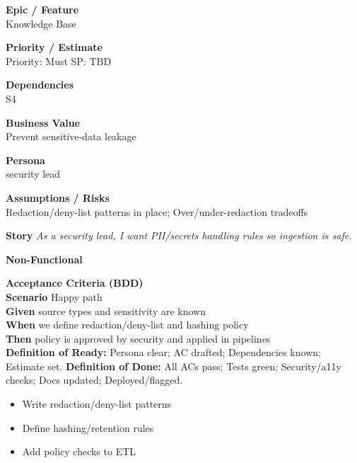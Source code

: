 \documentclass[11pt,a4paper]{article}
\newenvironment{StoryCard}[2][]{
  \begin{tcolorbox}[enhanced, breakable, sharp corners=all, colback=cardback, colframe=cardframe,
    title={#2}, fonttitle=\bfseries\large, boxrule=0.6pt, borderline west={2pt}{0pt}{accent}, #1]
}{
  \end{tcolorbox}
}
\newcommand{\badge}[1]{\pill{\footnotesize #1}}
\newcommand{\cb}{\(\square\)}
\newenvironment{TasksBox}[1][Tasks]{%
  \begin{tcolorbox}[enhanced,breakable,
    colback=cardback, colframe=cardframe, title={#1},
    borderline west={1.8pt}{0pt}{MidnightBlue},
    arc=2pt, boxrule=0.4pt,
    left=10pt,right=10pt,top=6pt,bottom=6pt,
    before skip=6pt, after skip=10pt
  ]
  \small
  \begin{itemize}[label=\cb, leftmargin=*, labelsep=0.6em, itemsep=4pt, topsep=2pt, parsep=0pt]
}{%
  \end{itemize}
  \end{tcolorbox}
}
\begin{document}
\begin{StoryCard}{S5 — PII/Secrets policy for corp content}
\noindent\begin{minipage}[t]{0.49\textwidth}
\textbf{Epic / Feature}\\
Knowledge Base

\medskip
\textbf{Priority / Estimate}\\
Priority: Must \quad SP: TBD

\medskip
\textbf{Dependencies}\\
S4
\end{minipage}\hfill
\begin{minipage}[t]{0.49\textwidth}
\textbf{Business Value}\\
Prevent sensitive-data leakage

\medskip
\textbf{Persona}\\
security lead

\medskip
\textbf{Assumptions / Risks}\\
Redaction/deny-list patterns in place; Over/under-redaction tradeoffs
\end{minipage}

\medskip
\textbf{Story} \emph{As a security lead, I want PII/secrets handling rules so ingestion is safe.}

\medskip
\textbf{Non-Functional}
\badge{Security}\ \badge{Privacy}

\medskip
\textbf{Acceptance Criteria (BDD)}\\
\textbf{Scenario} Happy path\\
\textbf{Given} source types and sensitivity are known\\
\textbf{When} we define redaction/deny-list and hashing policy\\
\textbf{Then} policy is approved by security and applied in pipelines\\

\medskip
\footnotesize \textbf{Definition of Ready:} Persona clear; AC drafted; Dependencies known; Estimate set.\quad
\textbf{Definition of Done:} All ACs pass; Tests green; Security/a11y checks; Docs updated; Deployed/flagged.
\end{StoryCard}

\begin{TasksBox}[Tasks]
  \item Write redaction/deny-list patterns
  \item Define hashing/retention rules
  \item Add policy checks to ETL
\end{TasksBox}
\clearpage
\end{document}
